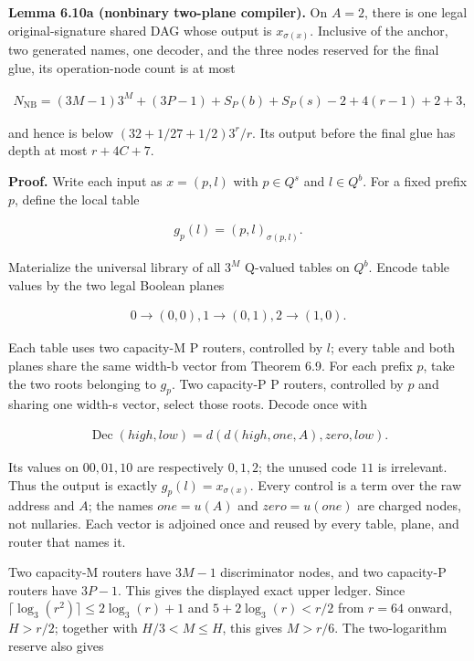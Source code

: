 \documentclass[
  11pt,
]{article}
\theoremstyle{definition}
\theoremstyle{remark}
\begin{document}
\textbf{Lemma 6.10a (nonbinary two-plane compiler).} On \(A=2\), there
is one legal original-signature shared DAG whose output is
\(x_{\sigma(x)}\). Inclusive of the anchor, two generated names, one
decoder, and the three nodes reserved for the final glue, its
operation-node count is at most

\[
\begin{aligned}
N_{\mathrm{NB}} = (3M-1)3^M+(3P-1)+S_P(b)+S_P(s)-2+4(r-1)+2+3,
\end{aligned}
\]

and hence is below \((32+1/27+1/2)3^r/r\). Its output before the final
glue has depth at most \(r+4C+7\).

\textbf{Proof.} Write each input as \(x=(p,l)\) with \(p \in Q^s\) and
\(l \in Q^b\). For a fixed prefix \(p\), define the local table

\[
\begin{aligned}
g_p(l)=(p,l)_{\sigma(p,l)}.
\end{aligned}
\]

Materialize the universal library of all \(3^M\) Q-valued tables on
\(Q^b\). Encode table values by the two legal Boolean planes

\[
\begin{aligned}
0 \to  (0,0),   1 \to  (0,1),   2 \to  (1,0).
\end{aligned}
\]

Each table uses two capacity-M P routers, controlled by \(l\); every
table and both planes share the same width-b vector from Theorem 6.9.
For each prefix \(p\), take the two roots belonging to \(g_p\). Two
capacity-P P routers, controlled by \(p\) and sharing one width-s
vector, select those roots. Decode once with

\[
\begin{aligned}
\operatorname{Dec}(high,low)=d(d(high,one,A),zero,low).
\end{aligned}
\]

Its values on \(00,01,10\) are respectively \(0,1,2\); the unused code
\(11\) is irrelevant. Thus the output is exactly
\(g_p(l)=x_{\sigma(x)}\). Every control is a term over the raw address
and \(A\); the names \(one=u(A)\) and \(zero=u(one)\) are charged nodes,
not nullaries. Each vector is adjoined once and reused by every table,
plane, and router that names it.

Two capacity-M routers have \(3M-1\) discriminator nodes, and two
capacity-P routers have \(3P-1\). This gives the displayed exact upper
ledger. Since \(\lceil \log_3(r^2) \rceil\le 2\log_3(r)+1\) and
\(5+2\log_3(r)<r/2\) from \(r=64\) onward, \(H>r/2\); together with
\(H/3<M\le H\), this gives \(M>r/6\). The two-logarithm reserve also
gives
\end{document}
